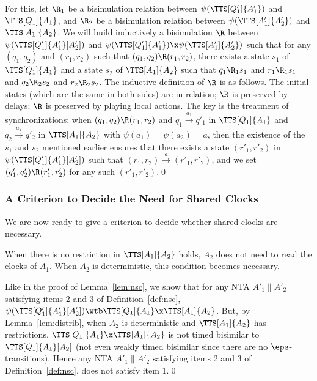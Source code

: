 \documentclass{LMCS}
\theoremstyle{plain}\newtheorem*{prop11}{Proposition~\ref{prop:states} bis}
\begin{document}
  For this, let $\R_1$ be a bisimulation relation between
  $\psi(\TTS[Q'_1]{A'_1})$ and $\TTS[Q_1]{A_1}$, and $\R_2$ be a
  bisimulation relation between $\psi(\TTS[A'_1]{A'_2})$ and
  $\TTS[A_1]{A_2}$. We will build inductively a bisimulation $\R$ between
  $\psi(\TTS[Q'_1]{A'_1}[A'_2])$ and
  $\psi(\TTS[Q'_1]{A'_1})\x\psi(\TTS[A'_1]{A'_2})$ such that for any $(q_1,
  q_2)$ and $(r_1, r_2)$ such that $(q_1, q_2) \R (r_1, r_2)$, there exists
  a state $s_1$ of $\TTS[Q_1]{A_1}$ and a state $s_2$ of
  $\TTS[A_1]{A_2}$ such that $q_1 \R_1 s_1$ and $r_1 \R_1 s_1$ and $q_2
  \R_2 s_2$ and $r_2 \R_2 s_2$.
The inductive definition of $\R$ is as follows. The initial states (which
  are the same in both sides) are in relation; $\R$ is preserved by delays;
  $\R$ is preserved by playing local actions. The key is the treatment of
  synchronizations: when $(q_1, q_2) \R (r_1, r_2)$ and $q_1
  \xrightarrow{a_1} q'_1$ in $\TTS[Q_1]{A_1}$ and $q_2 \xrightarrow{a_2}
  q'_2$ in $\TTS[A_1]{A_2}$ with $\psi(a_1) = \psi(a_2) = a$, then the
  existence of the $s_1$ and $s_2$ mentioned earlier ensures that there
  exists a state $(r'_1, r'_2)$ in $\psi(\TTS[Q'_1]{A'_1}[A'_2])$ such that
  $(r_1, r_2) \xrightarrow{a} (r'_1, r'_2)$, and we set $(q'_1, q'_2) \R
  (r'_1, r'_2)$ for any such $(r'_1, r'_2)$.\qed

\subsubsection{A Criterion to Decide the Need for Shared Clocks}
We are now ready to give a criterion to decide whether shared clocks are necessary.
\begin{thm}\label{thm:nsc}
  When there is no restriction in $\TTS[A_1]{A_2}$ holds, $A_2$ does not
  need to read the clocks of $A_1$. When $A_2$ is deterministic, this
  condition becomes necessary.
\end{thm}


  Like in the proof of Lemma~\ref{lem:nsc}, we show that for any NTA
  $A'_1 \parallel A'_2$ satisfying items 2 and 3 of Definition~\ref{def:nsc},
  $\psi(\TTS[Q'_1]{A'_1}[A'_2]) \wtb \TTS[Q_1]{A_1}\x\TTS[A_1]{A_2}$. But, by
  Lemma~\ref{lem:distrib}, when $A_2$ is deterministic and $\TTS[A_1]{A_2}$
  has restrictions, $\TTS[Q_1]{A_1}\x\TTS[A_1]{A_2}$ is not timed bisimilar to
  $\TTS[Q_1]{A_1}[A_2]$ (not even weakly timed bisimilar since there are no
  $\eps$-transitions). Hence any NTA $A'_1 \parallel A'_2$ satisfying items
  2 and 3 of Definition~\ref{def:nsc}, does not satisfy item 1.\qed
\end{document}
